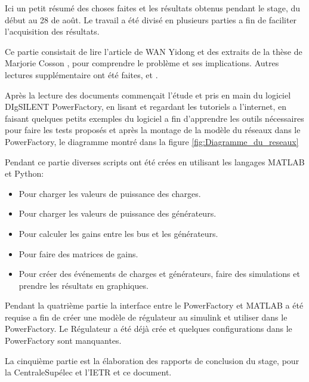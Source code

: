 \documentclass[a4paper,twoside]{article}
\begin{document}
\maketitle

Ici un petit résumé des choses faites et les résultats obtenus pendant le stage, du début au 28 de août.
Le travail a été divisé en plusieurs parties a fin de faciliter l'acquisition des résultats.

Ce partie consistait de lire l'article de WAN Yidong \cite{yidong} et des extraits de la thèse de Marjorie  Cosson \cite{cosson:tel-01374469}, pour comprendre le problème et ses implications. Autres lectures supplémentaire ont été faites, \cite{farina2015model} et \cite{mariani2013controllo}.

Après la lecture des documents commençait l'étude et pris en main du logiciel DIgSILENT PowerFactory, en lisant et regardant les tutoriels a l'internet, en faisant quelques petits exemples du logiciel a fin d'apprendre les outils nécessaires pour faire les tests proposés et après la montage de la modèle du réseaux dans le PowerFactory, le diagramme montré dans la figure \ref{fig:Diagramme_du_reseaux} 

Pendant ce partie diverses scripts ont été crées en utilisant les langages MATLAB et Python:
\begin{itemize}
\item Pour charger les valeurs de puissance des charges.
\item Pour charger les valeurs de puissance des générateurs.
\item Pour calculer les gains entre les bus et les générateurs.
\item Pour faire des matrices de gains.
\item Pour créer des événements de charges et générateurs, faire des simulations et prendre les résultats en graphiques.
\end{itemize}

Pendant la quatrième partie la interface entre le PowerFactory et MATLAB a été requise a fin de créer une modèle de régulateur au simulink et utiliser dans le PowerFactory. Le Régulateur a été déjà crée et quelques configurations dans le PowerFactory sont manquantes.


La cinquième partie est la élaboration des rapports de conclusion du stage, pour la CentraleSupélec et l'IETR et ce document.
\end{document}
